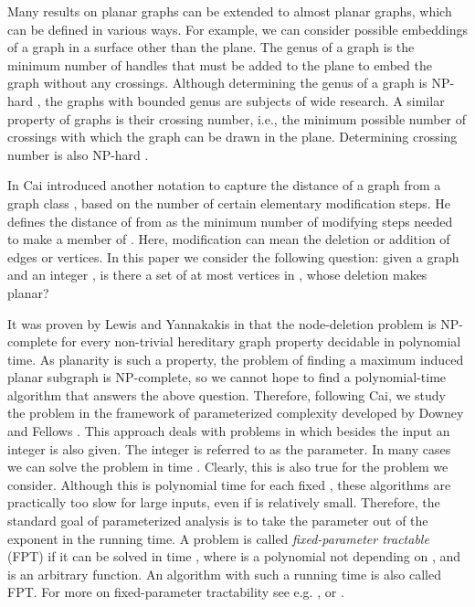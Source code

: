 \documentclass{llncs}
\begin{document}
Many results on planar graphs can be extended to almost planar graphs,
which can be defined in various ways.
For example, we can consider possible embeddings of a graph in a surface other than the plane.
The genus of a graph is the minimum number of handles that must be added to the
plane to embed the graph without any crossings.
Although determining the genus of a graph is NP-hard \cite{tho89},
the graphs with bounded genus are subjects of wide research.
A similar property of graphs is their crossing number, i.e.,
the minimum possible number of crossings with which the graph can be drawn in the plane.
Determining crossing number is also NP-hard \cite{gar83}.

In \cite{cai96} Cai introduced another notation to capture the distance of a
graph  from a graph class , based on the number of certain elementary modification steps.
He defines the distance of  from  as the minimum number of modifying steps needed to
make  a member of .
Here, modification can mean the deletion or addition of edges or vertices.
In this paper we consider the following question: given a graph  and an integer
, is there a set of at most  vertices in , whose deletion makes  planar?

It was proven by Lewis and Yannakakis in \cite{lew80} that the node-deletion problem is NP-complete
for every non-trivial hereditary graph property decidable in polynomial time.
As planarity is such a property, the problem of finding a maximum induced planar subgraph is NP-complete,
so we cannot hope to find a polynomial-time algorithm that answers the above question.
Therefore, following Cai, we study the problem in the framework of parameterized complexity
developed by Downey and Fellows \cite{dow99}.
This approach deals with problems in which besides the input  an integer  is also
given. The integer  is referred to as the parameter.
In many cases we can solve the problem in time .
Clearly, this is also true for the problem we consider.
Although this is polynomial time for each fixed , these algorithms are practically
too slow for large inputs, even if  is relatively small.
Therefore, the standard goal of parameterized analysis is to take the parameter
out of the exponent in the running time.
A problem is called \emph{fixed-parameter tractable} (FPT) if it can be solved in
time , where  is a polynomial not depending on , and  is an arbitrary function.
An algorithm with such a running time is also called FPT.
For more on fixed-parameter tractability see e.g.  \cite{dow99}, \cite{nie06} or \cite{flu06}.
\end{document}
